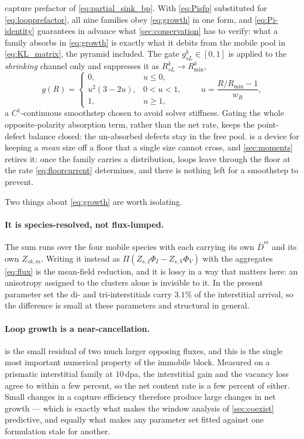 \documentclass{article}
\begin{document}
capture prefactor of \cref{eq:partial_sink_bp}. With \cref{eq:Pisfp} substituted
for \cref{eq:loopprefactor}, all nine families obey \cref{eq:growth} in one form,
and \cref{eq:Pi-identity} guarantees in advance what \cref{sec:conservation} has
to verify: what a family absorbs in \cref{eq:growth} is exactly what it debits
from the mobile pool in \cref{eq:KL_matrix}, the pyramid included.
The gate $g^k_{sL}\in[0,1]$ is applied to the \emph{shrinking} channel only and
suppresses it as $R^k_{sL}\to R^k_{\min}$,
\begin{equation}
  g(R)=\begin{cases}0,& u\le0,\\ u^2(3-2u),&0<u<1,\\ 1,& u\ge1,\end{cases}
  \qquad u=\frac{R/R_{\min}-1}{w_R},
  \label{eq:gate}
\end{equation}
a $C^1$-continuous smoothstep chosen to avoid solver stiffness. Gating the whole
opposite-polarity absorption term, rather than the net rate, keeps the
point-defect balance closed: the un-absorbed defects stay in the free pool.
 is a device for keeping a \emph{mean} size off a floor that a
single size cannot cross, and \cref{sec:moments} retires it: once the family
carries a distribution, loops leave through the floor at the rate
\cref{eq:floorcurrent} determines, and there is nothing left for a smoothstep to
prevent.

Two things about \cref{eq:growth} are worth isolating.

\paragraph{It is species-resolved, not flux-lumped.} The sum runs over the four
mobile species with each carrying its own $\overline{D}^m$ and its own
$Z_{sk,m}$. Writing it instead as $\Pi(Z_{s,I}\Phi_I-Z_{s,V}\Phi_V)$ with the
aggregates \cref{eq:flux} is the mean-field reduction, and it is lossy in a way
that matters here: an anisotropy assigned to the clusters alone is invisible to
it. In the present parameter set the di- and tri-interstitials carry $3.1\%$ of
the interstitial arrival, so the difference is small at these parameters and
structural in general.

\paragraph{Loop growth is a near-cancellation.}  is the small
residual of two much larger opposing fluxes, and this is the single most
important numerical property of the immobile block. Measured on a prismatic
interstitial family at $10\,$dpa, the interstitial gain and the vacancy loss
agree to within a few percent, so the net content rate is a few percent of
either. Small changes in a capture efficiency therefore produce large changes in
net growth --- which is exactly what makes the window analysis of
\cref{sec:coexist} predictive, and equally what makes any parameter set fitted
against one formulation stale for another.
\end{document}
